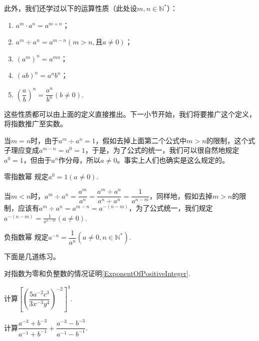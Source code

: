 \documentclass[lang=cn,math=cm,chinesefont=nofont,11pt,scheme=chinese,twocol]{elegantbook}
\begin{document}
此外，我们还学过以下的运算性质（此处设$m,n\in\mathbb{N}^*$）：

\begin{property}\label{LawOfIndices1}
  \begin{spacing}{1.8}
    \begin{enumerate}
    \item $a^m\cdot a^n=a^{m+n}$；
    \item $a^m\div a^n=a^{m-n}(m>n,\text{且}a\neq 0)$；
    \item $(a^m)^n=a^{mn}$；
    \item $(ab)^n=a^nb^n$；
    \item $\left(\dfrac ab\right)^n=\dfrac{a^n}{b^n}(b\neq 0)$.
    \end{enumerate}  
  \end{spacing}
\end{property}

这些性质都可以由上面的定义直接推出。下一小节开始，我们将要推广这个定义，将指数推广至实数。

当$m=n$时，由于$a^m\div a^n=1$，假如去掉上面第二个公式中$m>n$的限制，这个式子理应变成$a^{m-n}=a^0=1$，于是，为了公式的统一，我们可以很自然地规定$a^0=1$，但由于$a^n$作分母，所以$a\neq 0$。事实上人们也确实是这么规定的。

\begin{definition}{零指数幂}
  规定$a^0=1(a\neq 0)$.
\end{definition}

当$m<n$时，$a^m\div a^n=\dfrac{a^m}{a^n}=\dfrac{a^m\div a^n}{a^n\div a^n}=\dfrac1{a^{n-m}}$，同样地，假如去掉$m>n$的限制，应该有$a^m\div a^n=a^{m-n}=a^{-(n-m)}$，为了公式统一，我们规定$a^{-(n-m)}=\frac1{a^{n-m}}(a\neq0)$.

\begin{definition}{负指数幂}
  规定$a^{-n}=\dfrac{1}{a^n}(a\neq 0,n\in\mathbb{N}^*)$.
\end{definition}

下面是几道练习。

\begin{exercise}
  对指数为零和负整数的情况证明\ref{ExponentOfPositiveInteger}.
\end{exercise}

\begin{spacing}{1.8}
  \begin{exercise}\label{ZXSXZYJC_reformatted_3_P9.8b}
  计算$\left[\left(\dfrac{5a^{-2}c^3}{3x^{-3}y^4}\right)^{-2}\right]^4$.
  \end{exercise}

  \begin{exercise}\label{ZXSXSYJC_reformatted_3_P9.9b}
  计算$\dfrac{a^{-3}+b^{-3}}{a^{-1}+b^{-1}}+\dfrac{a^{-3}-b^{-3}}{a^{-1}-b^{-1}}$.
  \end{exercise}
\end{spacing}
\end{document}
